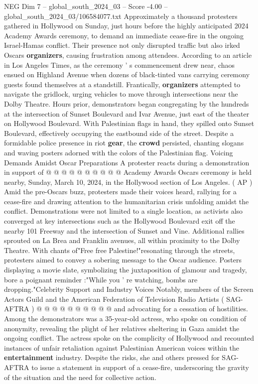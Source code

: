 \begin{textsample}{NEG Dim 7 – global\_south\_2024\_03 – Score -4.00 – global\_south\_2024\_03/106584077.txt}  \label{ex:f7_neg_426}
Approximately a thousand protesters gathered in Hollywood on Sunday, just hours before the highly anticipated 2024 Academy Awards ceremony, to demand an immediate cease-fire in the ongoing Israel-Hamas conflict.
Their presence not only disrupted traffic but also irked Oscars \textbf{organizers}, causing frustration among attendees.
According to an article in Los Angeles Times, as the ceremony ' s commencement drew near, chaos ensued on Highland Avenue when dozens of black-tinted vans carrying ceremony guests found themselves at a standstill.
Frantically, \textbf{organizers} attempted to navigate the gridlock, urging vehicles to move through intersections near the Dolby Theatre.
Hours prior, demonstrators began congregating by the hundreds at the intersection of Sunset Boulevard and Ivar Avenue, just east of the theater on Hollywood Boulevard.
With Palestinian flags in hand, they spilled onto Sunset Boulevard, effectively occupying the eastbound side of the street.
Despite a formidable police presence in riot \textbf{gear}, the \textbf{crowd} persisted, chanting slogans and waving posters adorned with the colors of the Palestinian flag.
Voicing Demands Amidst Oscar Preparations A protester reacts during a demonstration in support of @ @ @ @ @ @ @ @ @ @ Academy Awards Oscars ceremony is held nearby, Sunday, March 10, 2024, in the Hollywood section of Los Angeles. ( AP ) Amid the pre-Oscars buzz, protesters made their voices heard, rallying for a cease-fire and drawing attention to the humanitarian crisis unfolding amidst the conflict.
Demonstrations were not limited to a single location, as activists also converged at key intersections such as the Hollywood Boulevard exit off the nearby 101 Freeway and the intersection of Sunset and Vine.
Additional rallies sprouted on La Brea and Franklin avenues, all within proximity to the Dolby Theatre.
With chants of"Free free Palestine!"resonating through the streets, protesters aimed to convey a sobering message to the Oscar audience.
Posters displaying a movie slate, symbolizing the juxtaposition of glamour and tragedy, bore a poignant reminder :"While you ' re watching, bombs are dropping."Celebrity Support and Industry Voices Notably, members of the Screen Actors Guild and the American Federation of Television Radio Artists ( SAG-AFTRA ) @ @ @ @ @ @ @ @ @ @ and advocating for a cessation of hostilities.
Among the demonstrators was a 35-year-old actress, who spoke on condition of anonymity, revealing the plight of her relatives sheltering in Gaza amidst the ongoing conflict.
The actress spoke on the complicity of Hollywood and recounted instances of unfair retaliation against Palestinian American voices within the \textbf{entertainment} industry.
Despite the risks, she and others pressed for SAG-AFTRA to issue a statement in support of a cease-fire, underscoring the gravity of the situation and the need for collective action.

\end{textsample}
